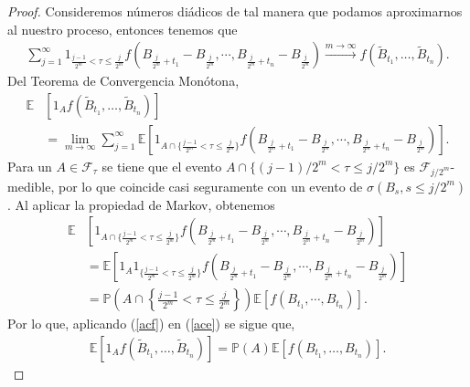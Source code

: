 \begin{proof}
Consideremos números diádicos de tal manera que podamos aproximarnos al nuestro proceso, entonces tenemos que
	\begin{align*}
	\sum_{j = 1}^{\infty} 1_{\frac{j-1}{2^m} < \tau \leq \frac{j}{2^m}} f \left( B_{\frac{j}{2^m} + t_1} - B_{\frac{j}{2^m}}, \cdots, B_{\frac{j}{2^m} + t_n} - B_{\frac{j}{2^m}}  \right) \xrightarrow{m \rightarrow \infty} f \left( \tilde{B}_{t_1}, \ldots, \tilde{B}_{t_n} \right).
	\end{align*}
Del Teorema de Convergencia Monótona, 
	\begin{align}
	\mathbb{E} & \left[1_A f \left( \tilde{B}_{t_1}, \ldots, \tilde{B}_{t_n} \right) \right] \nonumber  \\
	& = \lim_{m \rightarrow \infty} \sum_{j = 1}^{\infty} \mathbb{E} \left[ 1_{ A \cap \{\frac{j-1}{2^m} < \tau \leq \frac{j}{2^m}\}} f \left( B_{\frac{j}{2^m} + t_1} - B_{\frac{j}{2^m}}, \cdots, B_{\frac{j}{2^m} + t_n} - B_{\frac{j}{2^m}}  \right) \right]. \label{ace}
	\end{align}
Para un $A \in \mathcal{F}_{\tau}$ se tiene que el evento $A \cap \{(j-1)/2^m < \tau \leq j/2^m\}$ es $\mathcal{F}_{j/2^m}$-medible, por lo que coincide casi seguramente con un evento de $\sigma(B_s, s \leq j/2^m)$. Al aplicar la propiedad de Markov, obtenemos
	\begin{align}
	\mathbb{E} & \left[ 1_{ A \cap \{\frac{j-1}{2^m} < \tau \leq \frac{j}{2^m}\}} f \left( B_{\frac{j}{2^m} + t_1} - B_{\frac{j}{2^m}}, \cdots, B_{\frac{j}{2^m} + t_n} - B_{\frac{j}{2^m}}  \right) \right] \nonumber \\
	& = \mathbb{E} \left[ 1_A 1_{\{\frac{j-1}{2^m} < \tau \leq \frac{j}{2^m}\}} f \left( B_{\frac{j}{2^m} + t_1} - B_{\frac{j}{2^m}}, \cdots, B_{\frac{j}{2^m} + t_n} - B_{\frac{j}{2^m}}  \right) \right] \nonumber \\
	& = \mathbb{P} \left( A \cap \left\{ \frac{j-1}{2^m} < \tau \leq \frac{j}{2^m} \right\} \right) \mathbb{E} \left[ f \left( B_{t_1}, \cdots, B_{t_n} \right) \right]. \label{acf}
	\end{align}
Por lo que, aplicando (\ref{acf}) en (\ref{ace}) se sigue que,
	\begin{align*}
	\mathbb{E} \left[ 1_A f \left( \tilde{B}_{t_1}, \ldots, \tilde{B}_{t_n} \right) \right] = \mathbb{P} (A) \mathbb{E} \left[ f \left( B_{t_1}, \ldots, B_{t_n} \right) \right].
	\end{align*}
\end{proof}





